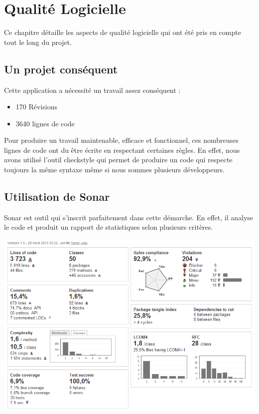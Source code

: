 \chapter{Qualité Logicielle}

Ce chapitre détaille les aspects de qualité logicielle qui ont été pris en compte tout le long du projet.

\section{Un projet conséquent}

Cette application a nécessité un travail assez conséquent :

\begin{itemize}
\item 170 Révisions
\item 3640 lignes de code
\end{itemize}

Pour produire un travail maintenable, efficace et fonctionnel, ces nombreuses lignes de code ont du être 
écrite en respectant certaines règles. En effet, nous avons utilisé l'outil checkstyle qui permet de produire un code qui respecte toujours la même syntaxe même si nous sommes plusieurs développeurs.

\section{Utilisation de Sonar}
Sonar est outil qui s'inscrit parfaitement dans cette démarche. En effet, il analyse le code et produit un rapport de statistiques selon plusieurs critères.

\includegraphics{img/sonar-dashboard.png} 

